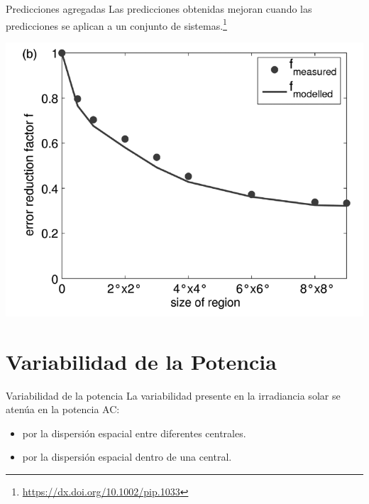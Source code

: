 \documentclass[aspectratio=169, usenames,svgnames,dvipsnames]{beamer}
\begin{document}
\begin{frame}[label={sec:org9ac8d3d}]{Predicciones agregadas}
Las predicciones obtenidas mejoran cuando las predicciones se aplican
a un conjunto de sistemas.\footnote{\url{https://dx.doi.org/10.1002/pip.1033}}

\begin{center}
\includegraphics[height=0.7\textheight]{../figs/ForecastEnsembleErrorReduction.png}
\end{center}
\end{frame}

\section{Variabilidad de la Potencia}
\label{sec:org1a33410}

\begin{frame}[label={sec:org5ecbc90}]{Variabilidad de la potencia}
La variabilidad presente en la irradiancia solar se \alert{atenúa} en la potencia AC:
\begin{itemize}
\item por la \alert{dispersión} espacial \alert{entre diferentes centrales}.
\item por la \alert{dispersión} espacial \alert{dentro de una central}.
\end{itemize}
\end{frame}
\end{document}
